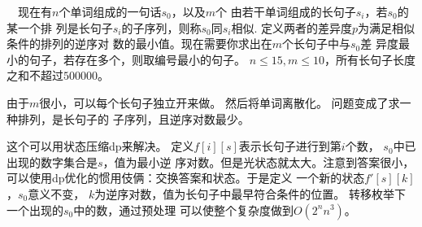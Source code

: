 \begin{prob}
	　现在有$n$个单词组成的一句话$s_0$，以及$m$个
	由若干单词组成的长句子$s_i$，若$s_0$的某一个排
	列是长句子$s_i$的子序列，则称$s_0$同$s_i$相似.
	定义两者的差异度$p$为满足相似条件的排列的逆序对
	数的最小值。现在需要你求出在$m$个长句子中与$s_0$差
	异度最小的句子，若存在多个，则取编号最小的句子。
	$n \le 15, m \le 10$，所有长句子长度之和不超过$500000$。
\end{prob}

\begin{sol}
	由于$m$很小，可以每个长句子独立开来做。
	然后将单词离散化。
	问题变成了求一种排列，是长句子的
	子序列，且逆序对数最少。
	\par 这个可以用状态压缩dp来解决。
	定义$f[i][s]$表示长句子进行到第$i$个数，
	$s_0$中已出现的数字集合是$s$，值为最小逆
	序对数。但是光状态就太大。注意到答案很小，
	可以使用dp优化的惯用伎俩：交换答案和状态。于是定义
	一个新的状态$f'[s][k]$，$s_0$意义不变，
	$k$为逆序对数，值为长句子中最早符合条件的位置。
	转移枚举下一个出现的$s_0$中的数，通过预处理
	可以使整个复杂度做到$O(2^n n^3)$。
\end{sol}
